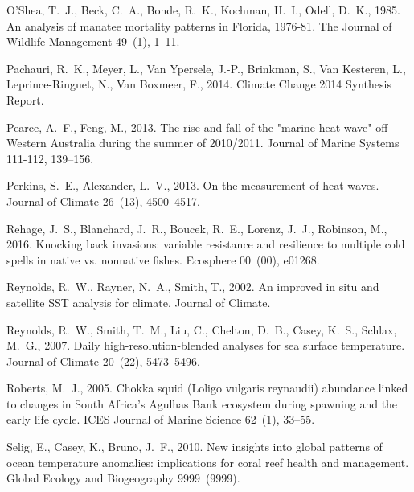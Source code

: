 \documentclass[a4paper,10pt,review]{elsarticle}
\begin{document}
\begin{thebibliography}{52}
O'Shea, T.~J., Beck, C.~A., Bonde, R.~K., Kochman, H.~I., Odell, D.~K., 1985.
  {An analysis of manatee mortality patterns in Florida, 1976-81}. The Journal
  of Wildlife Management 49~(1), 1--11.

Pachauri, R.~K., Meyer, L., {Van Ypersele}, J.-P., Brinkman, S., {Van
  Kesteren}, L., Leprince-Ringuet, N., {Van Boxmeer}, F., 2014. {Climate Change
  2014 Synthesis Report}.

Pearce, A.~F., Feng, M., 2013. {The rise and fall of the "marine heat wave" off
  Western Australia during the summer of 2010/2011}. Journal of Marine Systems
  111-112, 139--156.

Perkins, S.~E., Alexander, L.~V., 2013. {On the measurement of heat waves}.
  Journal of Climate 26~(13), 4500--4517.

Rehage, J.~S., Blanchard, J.~R., Boucek, R.~E., Lorenz, J.~J., Robinson, M.,
  2016. {Knocking back invasions: variable resistance and resilience to
  multiple cold spells in native vs. nonnative fishes}. Ecosphere 00~(00),
  e01268.

Reynolds, R.~W., Rayner, N.~A., Smith, T., 2002. {An improved in situ and
  satellite SST analysis for climate}. Journal of Climate.

Reynolds, R.~W., Smith, T.~M., Liu, C., Chelton, D.~B., Casey, K.~S., Schlax,
  M.~G., 2007. {Daily high-resolution-blended analyses for sea surface
  temperature}. Journal of Climate 20~(22), 5473--5496.

Roberts, M.~J., 2005. {Chokka squid (Loligo vulgaris reynaudii) abundance
  linked to changes in South Africa's Agulhas Bank ecosystem during spawning
  and the early life cycle}. ICES Journal of Marine Science 62~(1), 33--55.

Selig, E., Casey, K., Bruno, J.~F., 2010. {New insights into global patterns of
  ocean temperature anomalies: implications for coral reef health and
  management}. Global Ecology and Biogeography 9999~(9999).


\end{thebibliography}
\end{document}
